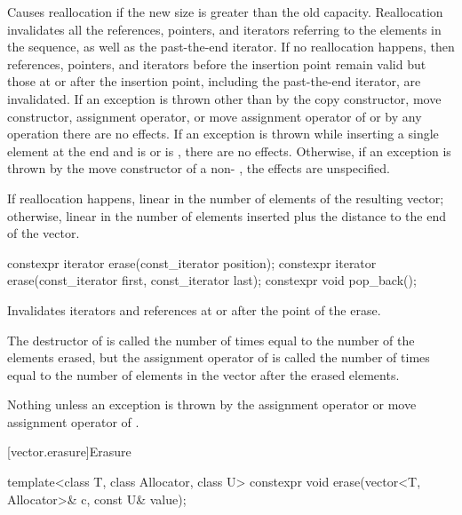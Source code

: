 \begin{itemdescr}
\pnum
\remarks
Causes reallocation if the new size is greater than the old capacity.
Reallocation invalidates all the references, pointers, and iterators
referring to the elements in the sequence, as well as the past-the-end iterator.
If no reallocation happens, then
references, pointers, and iterators
before the insertion point remain valid
but those at or after the insertion point,
including the past-the-end iterator,
are invalidated.
If an exception is thrown other than by
the copy constructor, move constructor,
assignment operator, or move assignment operator of
 or by any  operation
there are no effects.
If an exception is thrown while inserting a single element at the end and
 is  or 
is , there are no effects.
Otherwise, if an exception is thrown by the move constructor of a non-
, the effects are unspecified.

\pnum
\complexity
If reallocation happens,
linear in the number of elements of the resulting vector;
otherwise,
linear in the number of elements inserted plus the distance
to the end of the vector.
\end{itemdescr}

%
\begin{itemdecl}
constexpr iterator erase(const_iterator position);
constexpr iterator erase(const_iterator first, const_iterator last);
constexpr void pop_back();
\end{itemdecl}

\begin{itemdescr}
\pnum
\effects
Invalidates iterators and references at or after the point of the erase.

\pnum
\complexity
The destructor of  is called the number of times equal to the
number of the elements erased, but the assignment operator
of  is called the number of times equal to the number of
elements in the vector after the erased elements.

\pnum
\throws
Nothing unless an exception is thrown by the
assignment operator or move assignment operator of
.
\end{itemdescr}

[vector.erasure]{Erasure}

%
\begin{itemdecl}
template<class T, class Allocator, class U>
  constexpr void erase(vector<T, Allocator>& c, const U& value);
\end{itemdecl}

